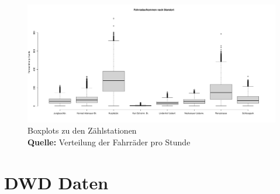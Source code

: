 \documentclass[a4paper,12pt]{thesis}
\newcommand*{\captionsource}[2]{%
	\caption[{#1}]{%
		#1%
		\\\hspace{\linewidth}%
		\textbf{Quelle:} #2%
	}%
}
\begin{document}
\begin{figure}[!ht]
	\centering
	\includegraphics[width=\textwidth]{Plots/Boxplot_Stationen.pdf}
	\captionsource{Boxplots zu den Zählstationen}{
		Verteilung der Fahrräder pro Stunde
	}
	\label{BoxplotStationen}
\end{figure}

\section{DWD Daten}
\end{document}
